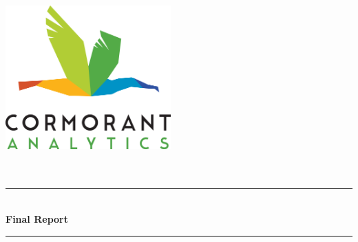 \begin{titlepage}

\newcommand{\HRule}{\rule{\linewidth}{0.5mm}} %

\center %

\includegraphics[width = 2.5in]{../figures/birdword.png}\\[1cm] %
 

\textsc{\large }\\[0.5cm] %
\textsc{\large }\\[0.5cm] %


\HRule \\[0.4cm]
{ \huge \bfseries Final Report}\\[0.4cm] %
\HRule \\[1.5cm]
 


\end{titlepage}
